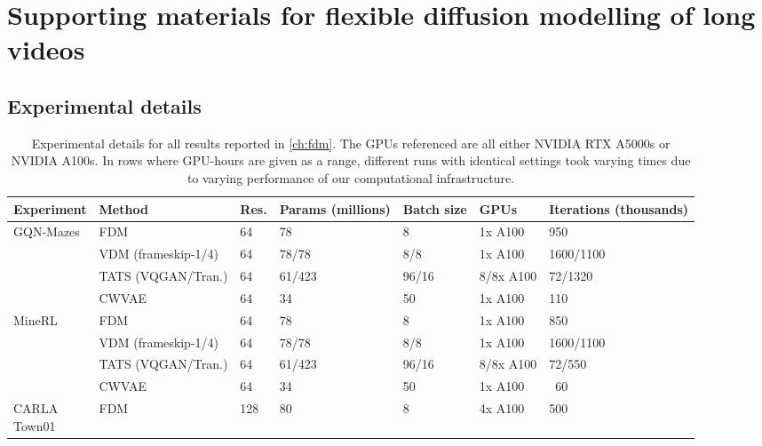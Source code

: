 \chapter{Supporting materials for flexible diffusion modelling of long videos} \label{app:fdm}

\section{Experimental details}
\begin{table}[t]
  \tiny
  \caption{Experimental details for all results reported in \cref{ch:fdm}. The GPUs referenced are all either NVIDIA RTX A5000s or NVIDIA A100s. In rows where GPU-hours are given as a range, different runs with identical settings took varying times due to varying performance of our computational infrastructure.}
  \label{tab:fdm-experimental-details}
  \centering
  \begin{tabular}{p{1.1cm}llp{0.9cm}p{0.6cm}lp{1cm}}
    \toprule
     Experiment  & Method & Res.  & Params (millions)  & Batch size  &  GPUs  & Iterations (thousands)\\
    \midrule
    \multirow{4}{*}{GQN-Mazes}         &  FDM                       & 64    & 78    & 8     & 1x A100   & 950       \\
                                       &  VDM (frameskip-1/4)       & 64    & 78/78 & 8/8   & 1x A100   & 1600/1100  \\
                                       &  TATS (VQGAN/Tran.)       & 64    & 61/423     & 96/16 & 8/8x A100 & 72/1320    \\
                                       &  CWVAE                     & 64    & 34    & 50    & 1x A100   & 110    \\
   \midrule
    \multirow{4}{*}{MineRL}            &  FDM                       & 64    & 78    & 8     & 1x A100   & 850       \\
                                       &  VDM (frameskip-1/4)       & 64    & 78/78 & 8/8   & 1x A100   & 1600/1100   \\
                                       &  TATS (VQGAN/Tran.)       & 64    & 61/423     & 96/16 & 8/8x A100   & 72/550    \\
                                       &  CWVAE                     & 64    & 34    & 50    & 1x A100   & ~60   \\
    \midrule
    \multirowcell{4}[0pt][l]{CARLA\\Town01}
                                       &  FDM                       & 128   & 80    & 8     & 4x A100   & 500       \\

\end{tabular}
\end{table}
